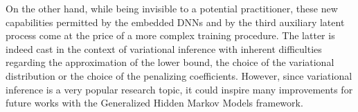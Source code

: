 On the other hand, while being invisible to a potential
practitioner, these new capabilities permitted by the embedded DNNs and by the
third auxiliary latent process come at the price of a more complex training
procedure. The latter is indeed cast in the context of variational inference
with inherent difficulties regarding the approximation of the lower bound, the
choice of the variational distribution or the choice of the penalizing
coefficients. However, since variational inference is a very popular research
topic, it could inspire many improvements for future works with the Generalized
Hidden Markov Models framework.
